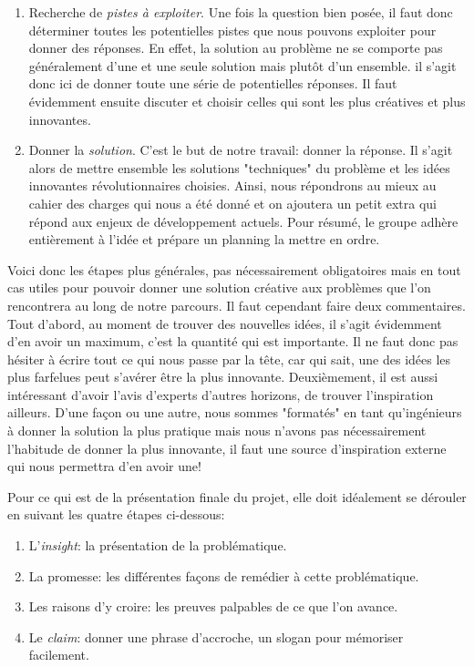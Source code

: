 \begin{enumerate}
\item Recherche de \textit{pistes à exploiter}. Une fois la question bien posée, il faut donc déterminer toutes les potentielles pistes que nous pouvons exploiter pour donner des réponses. En effet, la solution au problème ne se comporte pas généralement d'une et une seule solution mais plutôt d'un ensemble. il s'agit donc ici de donner toute une série de potentielles réponses. Il faut évidemment ensuite discuter et choisir celles qui sont les plus créatives et plus innovantes.

\item Donner la \textit{solution}. C'est le but de notre travail: donner la réponse. Il s'agit alors de mettre ensemble les solutions "techniques" du problème et les idées innovantes révolutionnaires choisies. Ainsi, nous répondrons au mieux au cahier des charges qui nous a été donné et on ajoutera un petit extra qui répond aux enjeux de développement actuels. Pour résumé, le groupe adhère entièrement à l'idée et prépare un planning la mettre en ordre.

\end{enumerate}

Voici donc les étapes plus générales, pas nécessairement obligatoires mais en tout cas utiles pour pouvoir donner une solution créative aux problèmes que l'on rencontrera au long de notre parcours. Il faut cependant faire deux commentaires. Tout d'abord, au moment de trouver des nouvelles idées, il s’agit évidemment d'en avoir un maximum, c'est la quantité qui est importante. Il ne faut donc pas hésiter à écrire tout ce qui nous passe par la tête, car qui sait, une des idées les plus farfelues peut s’avérer être la plus innovante. Deuxièmement, il est aussi intéressant d'avoir l'avis d'experts d'autres horizons, de trouver l'inspiration ailleurs. D'une façon ou une autre, nous sommes "formatés" en tant qu’ingénieurs à donner la solution la plus pratique mais nous n'avons pas nécessairement l'habitude de donner la plus innovante, il faut une source d'inspiration externe qui nous permettra d'en avoir une!

Pour ce qui est de la présentation finale du projet, elle doit idéalement se dérouler en suivant les quatre étapes ci-dessous:

\begin{enumerate}
\item L'\textit{insight}: la présentation de la problématique.
\item La promesse: les différentes façons de remédier à cette problématique.
\item Les raisons d’y croire: les preuves palpables de ce que l’on avance.
\item Le \textit{claim}: donner une phrase d’accroche, un slogan pour mémoriser facilement.
\end{enumerate}

